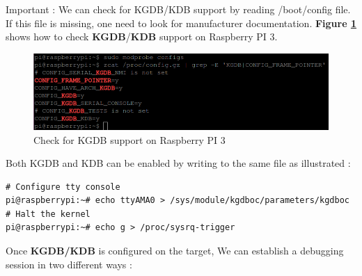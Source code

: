 Important : We can check for KGDB/KDB support by reading /boot/config file. If this file is missing, one need to look for manufacturer documentation. \textbf{Figure \ref{Check for KGDB support on Raspberry PI 3}} shows how to check \textbf{KGDB}/\textbf{KDB} support on Raspberry PI 3.
\begin{figure}[H]
		\centering
        \includegraphics[scale=0.35]{img/solution/kgdb-support-raspberry-pi-3.png}
        \caption{Check for KGDB support on Raspberry PI 3}
        \label{Check for KGDB support on Raspberry PI 3}
\end{figure}

 

Both KGDB and KDB can be enabled by writing to the same file as illustrated :
\begin{lstlisting}[style=BashInputStyle]
# Configure tty console
pi@raspberrypi:~# echo ttyAMA0 > /sys/module/kgdboc/parameters/kgdboc
# Halt the kernel
pi@raspberrypi:~# echo g > /proc/sysrq-trigger
\end{lstlisting}


Once \textbf{KGDB/KDB} is configured on the target, We can establish a debugging session in two different ways :

